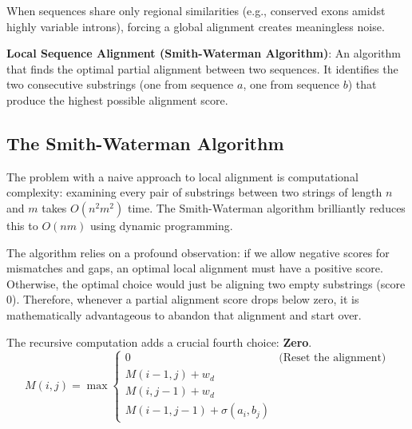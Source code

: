 \documentclass[11pt,a4paper]{article}
\begin{document}
When sequences share only regional similarities (e.g., conserved exons amidst highly variable introns), forcing a global alignment creates meaningless noise. 

\begin{important}
    \textbf{Local Sequence Alignment (Smith-Waterman Algorithm)}: An algorithm that finds the optimal partial alignment between two sequences. It identifies the two consecutive substrings (one from sequence \( a \), one from sequence \( b \)) that produce the highest possible alignment score.
\end{important}

\subsection{The Smith-Waterman Algorithm}
The problem with a naive approach to local alignment is computational complexity: examining every pair of substrings between two strings of length \( n \) and \( m \) takes \( O(n^2 m^2) \) time. The Smith-Waterman algorithm brilliantly reduces this to \( O(nm) \) using dynamic programming.

The algorithm relies on a profound observation: if we allow negative scores for mismatches and gaps, an optimal local alignment must have a positive score. Otherwise, the optimal choice would just be aligning two empty substrings (score 0). Therefore, whenever a partial alignment score drops below zero, it is mathematically advantageous to abandon that alignment and start over.

The recursive computation adds a crucial fourth choice: \textbf{Zero}.
\[
M(i, j) = \max \begin{cases} 
0 & \text{(Reset the alignment)} \\
M(i-1, j) + w_d \\
M(i, j-1) + w_d \\
M(i-1, j-1) + \sigma(a_i, b_j)
\end{cases}
\]
\end{document}
